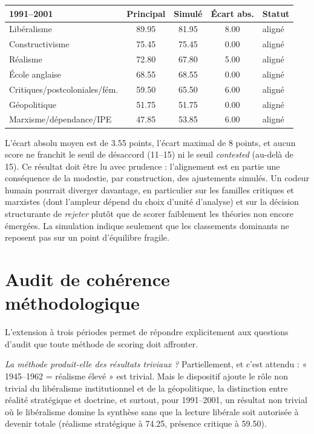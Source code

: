 \documentclass[11pt,a4paper]{article}
\begin{document}
\begin{center}
\begin{tabular}{p{4.6cm}cccp{2cm}}
\hline
1991--2001 & Principal & Simulé & Écart abs. & Statut \\
\hline
Libéralisme & 89.95 & 81.95 & 8.00 & aligné \\
Constructivisme & 75.45 & 75.45 & 0.00 & aligné \\
Réalisme & 72.80 & 67.80 & 5.00 & aligné \\
École anglaise & 68.55 & 68.55 & 0.00 & aligné \\
Critiques/postcoloniales/fém. & 59.50 & 65.50 & 6.00 & aligné \\
Géopolitique & 51.75 & 51.75 & 0.00 & aligné \\
Marxisme/dépendance/IPE & 47.85 & 53.85 & 6.00 & aligné \\
\hline
\end{tabular}
\end{center}

L'écart absolu moyen est de 3.55 points, l'écart maximal de 8 points, et aucun score ne franchit le seuil de désaccord (11--15) ni le seuil \emph{contested} (au-delà de 15). Ce résultat doit être lu avec prudence : l'alignement est en partie une conséquence de la modestie, par construction, des ajustements simulés. Un codeur humain pourrait diverger davantage, en particulier sur les familles critiques et marxistes (dont l'ampleur dépend du choix d'unité d'analyse) et sur la décision structurante de \emph{rejeter} plutôt que de scorer faiblement les théories non encore émergées. La simulation indique seulement que les classements dominants ne reposent pas sur un point d'équilibre fragile.

\section{Audit de cohérence méthodologique}

L'extension à trois périodes permet de répondre explicitement aux questions d'audit que toute méthode de scoring doit affronter.

\emph{La méthode produit-elle des résultats triviaux ?} Partiellement, et c'est attendu : « 1945--1962 = réalisme élevé » est trivial. Mais le dispositif ajoute le rôle non trivial du libéralisme institutionnel et de la géopolitique, la distinction entre réalité stratégique et doctrine, et surtout, pour 1991--2001, un résultat non trivial où le libéralisme domine la synthèse sans que la lecture libérale soit autorisée à devenir totale (réalisme stratégique à 74.25, présence critique à 59.50).
\end{document}

